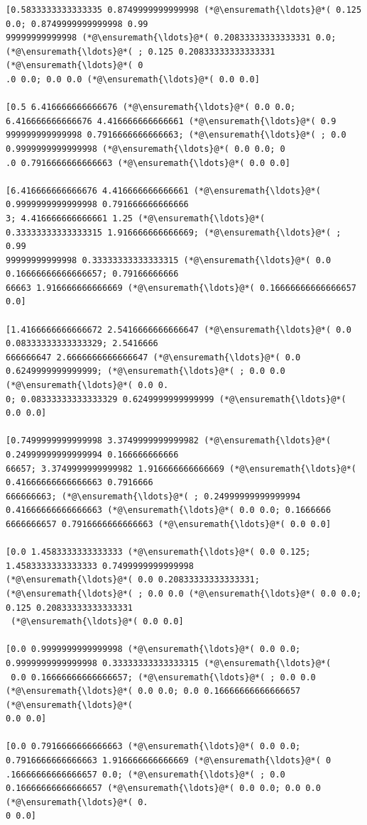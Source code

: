 \documentclass[12pt,a4paper]{article}
\begin{document}
\begin{lstlisting}
[0.5833333333333335 0.8749999999999998 (*@\ensuremath{\ldots}@*( 0.125 0.0; 0.8749999999999998 0.99
99999999999998 (*@\ensuremath{\ldots}@*( 0.20833333333333331 0.0; (*@\ensuremath{\ldots}@*( ; 0.125 0.20833333333333331 (*@\ensuremath{\ldots}@*( 0
.0 0.0; 0.0 0.0 (*@\ensuremath{\ldots}@*( 0.0 0.0]

[0.5 6.416666666666676 (*@\ensuremath{\ldots}@*( 0.0 0.0; 6.416666666666676 4.416666666666661 (*@\ensuremath{\ldots}@*( 0.9
999999999999998 0.7916666666666663; (*@\ensuremath{\ldots}@*( ; 0.0 0.9999999999999998 (*@\ensuremath{\ldots}@*( 0.0 0.0; 0
.0 0.7916666666666663 (*@\ensuremath{\ldots}@*( 0.0 0.0]

[6.416666666666676 4.416666666666661 (*@\ensuremath{\ldots}@*( 0.9999999999999998 0.791666666666666
3; 4.416666666666661 1.25 (*@\ensuremath{\ldots}@*( 0.33333333333333315 1.916666666666669; (*@\ensuremath{\ldots}@*( ; 0.99
99999999999998 0.33333333333333315 (*@\ensuremath{\ldots}@*( 0.0 0.16666666666666657; 0.79166666666
66663 1.916666666666669 (*@\ensuremath{\ldots}@*( 0.16666666666666657 0.0]

[1.4166666666666672 2.5416666666666647 (*@\ensuremath{\ldots}@*( 0.0 0.08333333333333329; 2.5416666
666666647 2.6666666666666647 (*@\ensuremath{\ldots}@*( 0.0 0.6249999999999999; (*@\ensuremath{\ldots}@*( ; 0.0 0.0 (*@\ensuremath{\ldots}@*( 0.0 0.
0; 0.08333333333333329 0.6249999999999999 (*@\ensuremath{\ldots}@*( 0.0 0.0]

[0.7499999999999998 3.3749999999999982 (*@\ensuremath{\ldots}@*( 0.24999999999999994 0.166666666666
66657; 3.3749999999999982 1.916666666666669 (*@\ensuremath{\ldots}@*( 0.41666666666666663 0.7916666
666666663; (*@\ensuremath{\ldots}@*( ; 0.24999999999999994 0.41666666666666663 (*@\ensuremath{\ldots}@*( 0.0 0.0; 0.1666666
6666666657 0.7916666666666663 (*@\ensuremath{\ldots}@*( 0.0 0.0]

[0.0 1.4583333333333333 (*@\ensuremath{\ldots}@*( 0.0 0.125; 1.4583333333333333 0.7499999999999998 
(*@\ensuremath{\ldots}@*( 0.0 0.20833333333333331; (*@\ensuremath{\ldots}@*( ; 0.0 0.0 (*@\ensuremath{\ldots}@*( 0.0 0.0; 0.125 0.20833333333333331
 (*@\ensuremath{\ldots}@*( 0.0 0.0]

[0.0 0.9999999999999998 (*@\ensuremath{\ldots}@*( 0.0 0.0; 0.9999999999999998 0.33333333333333315 (*@\ensuremath{\ldots}@*(
 0.0 0.16666666666666657; (*@\ensuremath{\ldots}@*( ; 0.0 0.0 (*@\ensuremath{\ldots}@*( 0.0 0.0; 0.0 0.16666666666666657 (*@\ensuremath{\ldots}@*( 
0.0 0.0]

[0.0 0.7916666666666663 (*@\ensuremath{\ldots}@*( 0.0 0.0; 0.7916666666666663 1.916666666666669 (*@\ensuremath{\ldots}@*( 0
.16666666666666657 0.0; (*@\ensuremath{\ldots}@*( ; 0.0 0.16666666666666657 (*@\ensuremath{\ldots}@*( 0.0 0.0; 0.0 0.0 (*@\ensuremath{\ldots}@*( 0.
0 0.0]


\end{lstlisting}
\end{document}
